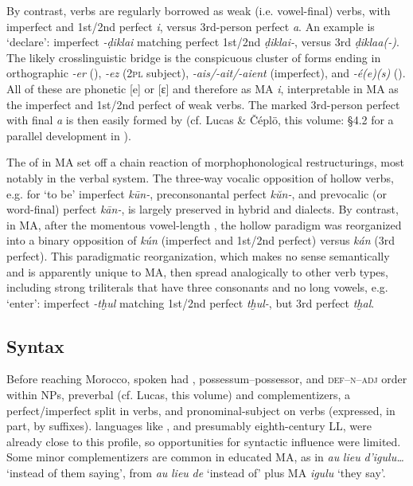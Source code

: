 \documentclass[output=paper]{langsci/langscibook}
\begin{document}
By contrast,  verbs are regularly borrowed as weak (i.e. vowel-final) verbs, with imperfect and 1st/2nd perfect \textit{i}, versus 3rd-person perfect \textit{a}. An example is ‘declare’: imperfect \textit{\nobreakdash-ḍikla{\R}i} matching perfect 1st/2nd \textit{ḍikla{\R}i-}, versus 3rd \textit{ḍikla{\R}a(-)}. The likely crosslinguistic bridge is the conspicuous cluster of  forms ending in orthographic \textit{{}-er} (), \textit{{}-ez} (2\textsc{pl} subject), \textit{{}-ais/-ait/-aient} (imperfect), and \textit{-é(e)(s)} (). All of these are phonetic [e] or [ɛ] and therefore  as MA \textit{i}, interpretable in MA as the imperfect and 1st/2nd perfect of weak verbs. The marked 3rd-person perfect with final \textit{a} is then easily formed by   (cf. Lucas \& Čéplö, this volume: §4.2 for a parallel development in ).

The  of  in  MA set off a chain reaction of morphophonological restructurings, most notably in the verbal system. The  three-way vocalic opposition of hollow verbs, e.g. for ‘to be’ imperfect \textit{kūn-}, preconsonantal perfect \textit{kŭn-}, and prevocalic (or word-final) perfect \textit{kān-}, is largely preserved in hybrid and  dialects. By contrast, in  MA, after the momentous vowel-length , the hollow paradigm was reorganized into a binary opposition of \textit{kún} (imperfect and 1st/2nd perfect) versus \textit{kán} (3rd perfect). This paradigmatic reorganization, which makes no sense semantically and is apparently unique to  MA, then spread analogically to other verb types, including strong triliterals that have three consonants and no long vowels, e.g. ‘enter’: imperfect \textit{-tḫul} matching 1st/2nd perfect \textit{tḫul-}, but 3rd perfect \textit{tḫal}.

\subsection{Syntax}

Before reaching Morocco, spoken  had , possessum--possessor, and \textsc{def--n--adj} order within NPs, preverbal  (cf. Lucas, this volume) and complementizers, a perfect/imperfect split in verbs, and pronominal-subject  on verbs (expressed, in part, by suffixes).  languages like , and presumably eighth-century LL, were already close to this profile, so opportunities for syntactic influence were limited. Some minor  complementizers are common in educated MA, as in \textit{au} \textit{lieu} \textit{d’igulu…} ‘instead of them saying’, from  \textit{au} \textit{lieu} \textit{de} ‘instead of’ plus MA \textit{igulu} ‘they say’. 
\end{document}
